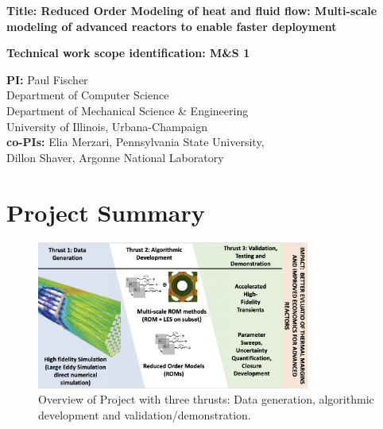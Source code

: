 \parindent 0in
\parskip 0.1in

{\bf Title:  Reduced Order Modeling of heat and fluid flow: Multi-scale
modeling of advanced reactors to enable faster deployment }

{\bf Technical work scope identification: M\&S 1 }

{\bf PI:}
Paul Fischer \\
Department of Computer Science \\
Department of Mechanical Science \& Engineering \\
University of Illinois, Urbana-Champaign \\

{\bf co-PIs:}
Elia Merzari, Pennsylvania State University, \\
Dillon Shaver, Argonne National Laboratory \\

\section{Project Summary}


\begin{figure}[b!] \centering
    \includegraphics[width = 0.80\textwidth]{figs/fig1.png}
    \caption{Overview of Project with three thrusts: Data generation,
             algorithmic development and validation/demonstration.  \label{fig:sum}}
\end{figure}

